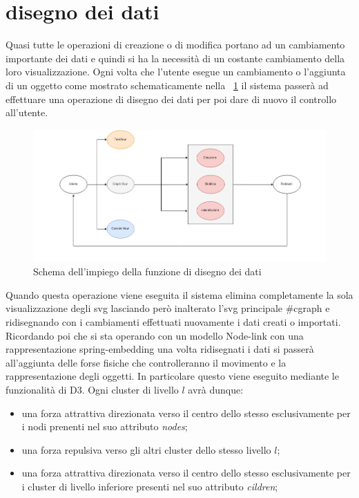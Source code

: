 {\section{disegno dei dati}
Quasi tutte le operazioni di creazione o di modifica portano ad un cambiamento importante dei dati e quindi si ha la necessità di un costante cambiamento della loro visualizzazione. Ogni volta che l'utente esegue un cambiamento o l'aggiunta di un oggetto come mostrato schematicamente nella \figurename~\ref{fig:redraw} il sistema passerà ad effettuare una operazione di disegno dei dati per poi dare di nuovo il controllo all'utente.
\begin{figure}[!htb]
	\begin{center}
		\includegraphics[width=1 \linewidth]{figure/redraw}
	\end{center}
	\caption{Schema dell'impiego della funzione di disegno dei dati \label{fig:redraw}}
\end{figure}
Quando questa operazione viene eseguita il sistema elimina completamente la sola visualizzazione degli svg lasciando però inalterato l'svg principale \#cgraph e ridisegnando con i cambiamenti effettuati nuovamente i dati creati o importati. Ricordando poi che si sta operando con un modello Node-link con una rappresentazione spring-embedding una volta ridisegnati i dati si passerà all'aggiunta delle forse fisiche che controlleranno il movimento e la rappresentazione degli oggetti. In particolare questo viene eseguito mediante le funzionalità di D3. Ogni cluster di livello $l$ avrà dunque:
\begin{itemize}
	\item una forza attrattiva direzionata verso il centro dello stesso esclusivamente per i nodi prenenti nel suo attributo \textit{nodes};
	\item una forza repulsiva verso gli altri cluster dello stesso livello $l$; 
	\item una forza attrattiva direzionata verso il centro dello stesso esclusivamente per i cluster di livello inferiore presenti nel suo attributo \textit{cildren};

\end{itemize}}
